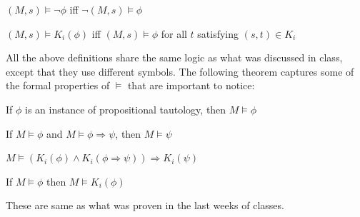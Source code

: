 \documentclass{article}
\begin{document}
\par $(M,s) \vDash\lnot\phi$ iff $\lnot(M,s)\vDash\phi$
\par $(M,s) \vDash K_i(\phi)$ iff $(M,s) \vDash \phi$ for all $t$ satisfying $(s,t)\in K_i$ \\
\par All the above definitions share the same logic as what was discussed in class, except that they use different symbols. The following theorem captures some of the formal properties of $\vDash$ that are important to notice: \\
\par If $\phi$ is an instance of propositional tautology, then $M\vDash\phi$
\par If $M\vDash\phi$ and $M\vDash\phi\Rightarrow\psi$, then $M\vDash\psi$
\par $M\vDash(K_i(\phi)\land K_i(\phi\Rightarrow\psi))\Rightarrow K_i(\psi)$
\par If $M\vDash\phi$ then $M\vDash K_i(\phi)$
\\
\par These are same as what was proven in the last weeks of classes.
\end{document}
